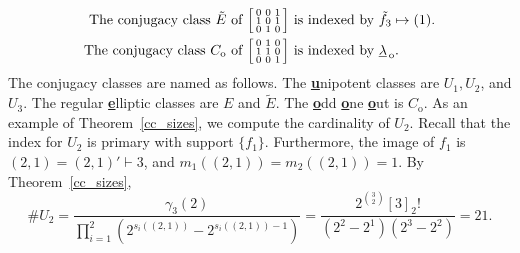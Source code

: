 \documentclass[Unicode,ALCO]{cedram}
\newcommand{\ulambda}{{\underline{\lambda}}}
\newcommand{\uline}[1]{{\underline{#1}}}
\begin{document}
\begin{example}
\begin{align*}
\text{The conjugacy class } \tilde{E} \text{ of }
\begin{bsmallmatrix}
0 & 0 & 1 \\
1 & 0 & 1 \\
0 & 1 & 0
\end{bsmallmatrix}
&
\text{ is indexed by }
\tilde{f}_3 \mapsto (1). \\
\text{The conjugacy class } C_{\mathrm{o}} \text{ of }
\begin{bsmallmatrix}
0 & 1 & 0 \\
1 & 1 & 0 \\
0 & 0 & 1
\end{bsmallmatrix}
&
\text{ is indexed by }
\ulambda_{\,\mathrm{o}}.
\end{align*}
The conjugacy classes are named as follows.
The \uline{\textbf{u}}nipotent classes are $U_1, U_2$, and $U_3$. The regular \uline{\textbf{e}}lliptic classes are $E$ and $\tilde{E}$. The \uline{\textbf{o}}dd \uline{\textbf{o}}ne \uline{\textbf{o}}ut is $C_{\mathrm{o}}$.
As an example of Theorem~\ref{cc_sizes}, we compute the cardinality of \(U_2\).
Recall that the index for \(U_2\) is primary with support \(\{f_1\}\).
Furthermore, the image of \(f_1\) is \((2,1) = (2,1)' \vdash 3\), and \(m_1((2,1)) = m_2((2,1)) = 1\).
By Theorem~\ref{cc_sizes},
\begin{equation}
\# U_2
=
\frac{\gamma_3(2)}{
\prod_{i = 1}^2
\left (
2^{s_i((2,1))}
-
2^{s_i((2,1)) - 1}
\right )
}
=
\frac{2^{\binom{3}{2}} [3]_2 !}{(2^2 - 2^1)(2^3 - 2^2)}
=
21.
\end{equation}

\end{example}
\end{document}
